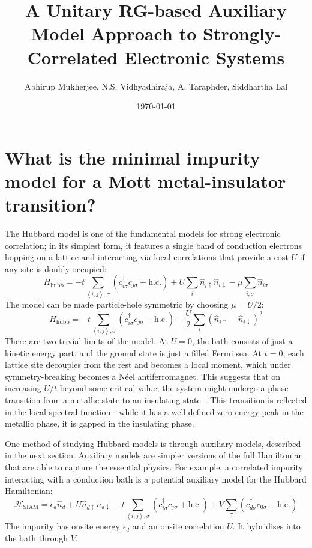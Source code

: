 \documentclass[prb]{revtex4-2}
\begin{document}
\title{\bf A Unitary RG-based Auxiliary Model Approach to Strongly-Correlated Electronic Systems}
\author{Abhirup Mukherjee, N.S. Vidhyadhiraja, A. Taraphder, Siddhartha Lal}
\date{\today}
\maketitle
\tableofcontents

\section{What is the minimal impurity model for a Mott metal-insulator transition?}
The Hubbard model is one of the fundamental models for strong electronic correlation; in its simplest form, it features a single band of conduction electrons hopping on a lattice and interacting via local correlations that provide a cost \(U\) if any site is doubly occupied:
\[H_\text{hubb} = -t\sum_{\left<i,j \right>,\sigma}\left(c^\dagger_{i\sigma}c_{j\sigma}+\text{h.c.}\right) + U\sum_i \hat n_{i \uparrow} \hat n_{i \downarrow} - \mu \sum_{i,\sigma}\hat n_{i\sigma}\]
The model can be made particle-hole symmetric by choosing \(\mu = U/2\):
\[H_\text{hubb} = -t\sum_{\left<i,j \right>,\sigma}\left(c^\dagger_{i\sigma}c_{j\sigma}+\text{h.c.}\right) - \frac{U}{2}\sum_i \left(\hat n_{i \uparrow} - \hat n_{i \downarrow}\right)^2\]
There are two trivial limits of the model. At \(U=0\), the bath consists of just a kinetic energy part, and the ground state is just a filled Fermi sea. At \(t=0\), each lattice site decouples from the rest and becomes a local moment, which under symmetry-breaking becomes a Néel antiferromagnet. This suggests that on increasing \(U/t\) beyond some critical value, the system might undergo a phase transition from a metallic state to an insulating state~\cite{Mott_1949}. This transition is reflected in the local spectral function - while it has a well-defined zero energy peak in the metallic phase, it is gapped in the insulating phase.

One method of studying Hubbard models is through auxiliary models, described in the next section. Auxiliary models are simpler versions of the full Hamiltonian that are able to capture the essential physics. For example, a correlated impurity interacting with a conduction bath is a potential auxiliary model for the Hubbard Hamiltonian:
\begin{equation}
\label{clus_bath_siam}
\mathcal{H}_\text{SIAM} = \epsilon_d \hat n_d + U \hat n_{d \uparrow} \hat n_{d \downarrow} - t\sum_{\left<i,j \right>, \sigma}\left(c^\dagger_{i\sigma}c_{j\sigma} + \text{h.c.}\right) + V\sum_\sigma \left( c^\dagger_{d\sigma}c_{0\sigma} + \text{h.c.}\right) 
\end{equation}
The impurity has onsite energy \(\epsilon_d\) and an onsite correlation \(U\). It hybridises into the bath through \(V\).
\end{document}
